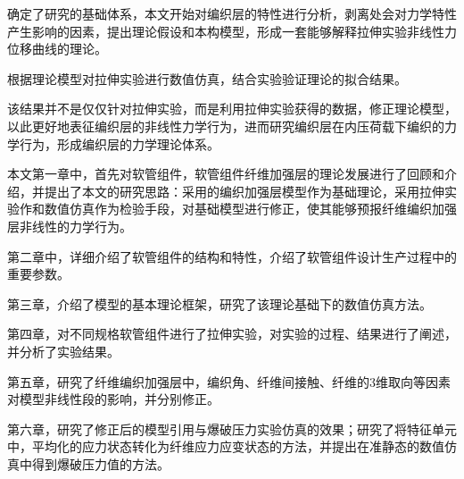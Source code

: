 确定了研究的基础体系，本文开始对编织层的特性进行分析，剥离处会对力学特性产生影响的因素，提出理论假设和本构模型，形成一套能够解释拉伸实验非线性力位移曲线的理论。

根据理论模型对拉伸实验进行数值仿真，结合实验验证理论的拟合结果。

该结果并不是仅仅针对拉伸实验，而是利用拉伸实验获得的数据，修正理论模型，以此更好地表征编织层的非线性力学行为，进而研究编织层在内压荷载下编织的力学行为，形成编织层的力学理论体系。

本文第一章中，首先对软管组件，软管组件纤维加强层的理论发展进行了回顾和介绍，并提出了本文的研究思路：采用\ha 的编织加强层模型作为基础理论，采用拉伸实验作和数值仿真作为检验手段，对基础模型进行修正，使其能够预报纤维编织加强层非线性的力学行为。

第二章中，详细介绍了软管组件的结构和特性，介绍了软管组件设计生产过程中的重要参数。

第三章，介绍了\ha 模型的基本理论框架，研究了该理论基础下的数值仿真方法。

第四章，对不同规格软管组件进行了拉伸实验，对实验的过程、结果进行了阐述，并分析了实验结果。

第五章，研究了纤维编织加强层中，编织角、纤维间接触、纤维的3维取向等因素对模型非线性段的影响，并分别修正。

第六章，研究了修正后的模型引用与爆破压力实验仿真的效果；研究了将特征单元中，平均化的应力状态转化为纤维应力应变状态的方法，并提出在准静态的数值仿真中得到爆破压力值的方法。

